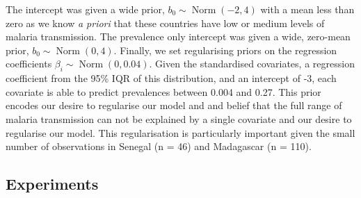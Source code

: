 \documentclass[10pt,letterpaper]{article}
\begin{document}
%
%
%
%
%
%
%

The intercept was given a wide prior, $b_0 \sim \operatorname{Norm}(-2, 4)$ with a mean less than zero as we know \emph{a priori} that these countries have low or medium levels of malaria transmission.
The prevalence only intercept was given a wide, zero-mean prior, $b_0 \sim \operatorname{Norm}(0, 4)$. %
Finally, we set regularising priors on the regression coefficients $\beta_i \sim \operatorname{Norm}(0, 0.04)$. 
Given the standardised covariates, a regression coefficient from the 95\% IQR of this distribution, and an intercept of -3, each covariate is able to predict prevalences between 0.004 and 0.27. 
This prior encodes our desire to regularise our model and and belief that the full range of malaria transmission can not be explained by a single covariate and our desire to regularise our model.
This regularisation is particularly important given the small number of observations in Senegal (n = 46) and Madagascar (n = 110).



\subsection*{Experiments}
\end{document}
